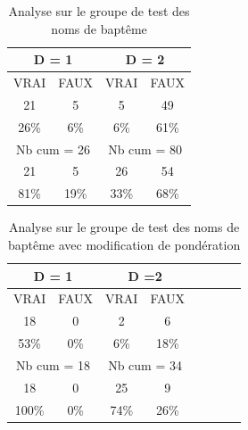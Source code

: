 \renewcommand{\arraystretch} {1.25}
\begin{table}[ht]
    \centering
    \begin{tabular}{|c|c|c|c|}
        \hline \multicolumn{2}{|c}{D = 1}& \multicolumn{2}{|c|}{D = 2}\\
        \hline VRAI & FAUX & VRAI & FAUX \\
        \hline \hline  21 & 5 & 5 & 49 \\
        \hline 26\% & 6\% & 6\% & 61\% \\
        \hline \hline \multicolumn{2}{|c}{Nb cum = 26}& \multicolumn{2}{|c|}{Nb cum = 80}\\
        \hline \hline  21 & 5 & 26 & 54 \\
        \hline 81\% & 19\% & 33\% & 68\% \\
        \hline 
    \end{tabular}
    \caption{Analyse sur le groupe  de test des noms de baptême}
    \label{groupe_prenom}
\end{table}

\renewcommand{\arraystretch} {1.25}
\begin{table}[ht]
    \centering
    \begin{tabular}{|c|c|c|c|c|c|c|c|}
        \hline \multicolumn{2}{|c}{D = 1}& \multicolumn{2}{|c|}{D =2 }\\
        \hline VRAI & FAUX & VRAI & FAUX \\
        \hline \hline  18 & 0 & 2 & 6 \\
        \hline 53\% & 0\% & 6\% & 18\% \\
        \hline \hline \multicolumn{2}{|c}{Nb cum = 18}& \multicolumn{2}{|c|}{Nb cum = 34}\\
        \hline \hline  18 & 0 & 25 & 9 \\
        \hline 100\% & 0\% & 74\% & 26\% \\
        \hline 
    \end{tabular}
    \caption{Analyse sur le groupe de test des noms de baptême avec modification de pondération}
    \label{groupe_prenom_md}
\end{table}
\vspace{1cm}

